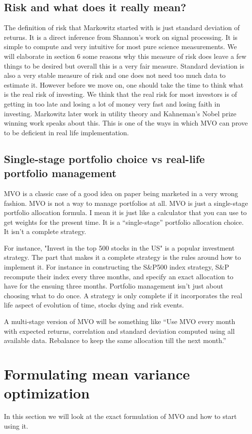 \documentclass[a4paper]{article}
\begin{document}
\subsection{ Risk and what does it really mean? }
The definition of risk that Markowitz started with is just standard deviation of returns. It is a direct inference from Shannon’s work on signal processing. It is simple to compute and very intuitive for most pure science measurements. We will elaborate in section 6 some reasons why this measure of risk does leave a few things to be desired but overall this is a very fair measure. Standard deviation is also a very stable measure of risk and one does not need too much data to estimate it. 
However before we move on, one should take the time to think what is the real risk of investing. We think that the real risk for most investors is of getting in too late and losing a lot of money very fast and losing faith in investing. Markowitz later work in utility theory and Kahneman’s Nobel prize winning work speaks about this. This is one of the ways in which MVO can prove to be deficient in real life implementation.
\subsection{ Single-stage portfolio choice vs real-life portfolio management }
MVO is a classic case of a good idea on paper being marketed in a very wrong fashion. MVO is not a way to manage portfolios at all. MVO is just a single-stage portfolio allocation formula. I mean it is just like a calculator that you can use to get weights for the present time. It is a “single-stage” portfolio allocation choice. It isn’t a complete strategy. 

For instance, "Invest in the top 500 stocks in the US" is a popular investment strategy. The part that makes it a complete strategy is the rules around how to implement it. For instance in constructing the S\&P500 index strategy, S\&P recompute their index every three months, and specify an exact allocation to have for the ensuing three months. Portfolio management isn’t just about choosing what to do once. A strategy is only complete if it incorporates the real life aspect of evolution of time, stocks dying and risk events. 

A multi-stage version of MVO will be something like “Use MVO every month with expected returns, correlation and standard deviation computed using all available data. Rebalance to keep the same allocation till the next month.”
\section{ Formulating mean variance optimization \label{what-is-mvo}}
In this section we will look at the exact formulation of MVO and how to start using it.
\end{document}
